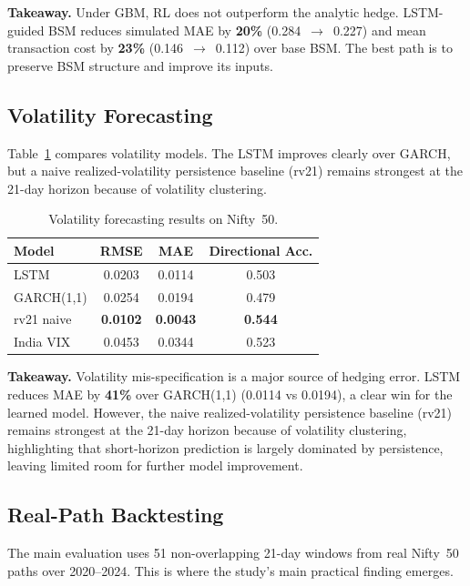 \documentclass[10pt,a4paper]{article}
\begin{document}
\textbf{Takeaway.} Under GBM, RL does not outperform the analytic hedge.
LSTM-guided BSM reduces simulated MAE by \textbf{20\%} (0.284~$\to$~0.227) and
mean transaction cost by \textbf{23\%} (0.146~$\to$~0.112) over base BSM.
The best path is to preserve BSM structure and improve its inputs.

\subsection*{Volatility Forecasting}
Table~\ref{tab:vol} compares volatility models. The LSTM improves clearly over
GARCH, but a naive realized-volatility persistence baseline (rv21) remains
strongest at the 21-day horizon because of volatility clustering.

\begin{table}[H]
\centering
\caption{Volatility forecasting results on Nifty~50.}
\label{tab:vol}
\begin{tabular}{lccc}
\toprule
Model & RMSE & MAE & Directional Acc. \\
\midrule
LSTM        & 0.0203 & 0.0114 & 0.503 \\
GARCH(1,1) \cite{Bollerslev1986} & 0.0254 & 0.0194 & 0.479 \\
rv21 naive  & \textbf{0.0102} & \textbf{0.0043} & \textbf{0.544} \\
India VIX   & 0.0453 & 0.0344 & 0.523 \\
\bottomrule
\end{tabular}
\end{table}

\textbf{Takeaway.} Volatility mis-specification is a major source of hedging
error. LSTM reduces MAE by \textbf{41\%} over GARCH(1,1) (0.0114 vs 0.0194),
a clear win for the learned model. However, the naive realized-volatility
persistence baseline (rv21) remains strongest at the 21-day horizon because
of volatility clustering, highlighting that short-horizon prediction is largely
dominated by persistence, leaving limited room for further model improvement.

\subsection*{Real-Path Backtesting}
The main evaluation uses 51 non-overlapping 21-day windows from real
Nifty~50 paths over 2020--2024. This is where the study’s main practical
finding emerges.
\end{document}
